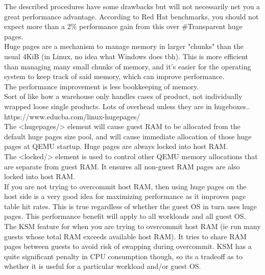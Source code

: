 \documentclass[11pt, a4paper, oneside]{article}
\theoremstyle{definition}
\begin{document}
The described procedures have some drawbacks but will not necessarily net you a great performance advantage. According to Red Hat benchmarks, you should not expect more than a 2$\%$ performance gain from this over $\#$Transparent huge pages.\\

Huge pages are a mechanism to manage memory in larger "chunks" than the usual 4KiB (in Linux, no idea what Windows does tbh). This is more efficient than managing many small chunks of memory, and it's easier for the operating system to keep track of said memory, which can improve performance.\\

The performance improvement is less bookkeeping of memory.\\
Sort of like how a warehouse only handles cases of product, not individually wrapped loose single products. Lots of overhead unless they are in hugeboxes..\\

https://www.educba.com/linux-hugepages/\\



The <hugepages/> element will cause guest RAM to be allocated from the default huge pages size pool, and will cause immediate allocation of those huge pages at QEMU startup. Huge pages are always locked into host RAM.\\

The <locked/> element is used to control other QEMU memory allocations that are separate from guest RAM. It ensures all non-guest RAM pages are also locked into host RAM.\\

If you are not trying to overcommit host RAM, then using huge pages on the host side is a very good idea for maximizing performance as it improves page table hit rates. This is true regardless of whether the guest OS in turn uses huge pages. This performance benefit will apply to all workloads and all guest OS.\\

The KSM feature for when you are trying to overcommit host RAM (ie run many guests whose total RAM exceeds available host RAM). It tries to share RAM pages between guests to avoid risk of swapping during overcommit. KSM has a quite significant penalty in CPU consumption though, so its a tradeoff as to whether it is useful for a particular workload and/or guest OS.\\
\end{document}
